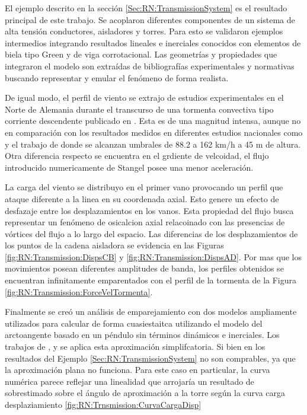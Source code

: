  El ejemplo descrito en la sección \ref{Sec:RN:TransmissionSystem} es el resultado principal de este trabajo. Se acoplaron diferentes componentes de un sistema de alta tensión conductores, aisladores y torres. Para esto se validaron ejemplos intermedios integrando resultados lineales e inerciales conocidos con elementos de biela tipo Green y de viga corrotacional. Las geometrías y propiedades que integraron el modelo son extraídas de bibliografías experimentales y normativas buscando representar y emular el fenómeno de forma realista. 

 De igual modo, el perfil de viento se extrajo de estudios experimentales en el Norte de Alemania durante el transcurso de una tormenta convectiva tipo corriente descendente publicado en \citep{stengel2017measurements}. Esta es de una magnitud intensa, aunque no en comparación con los resultados medidos en diferentes estudios nacionales como \citep{duranona2009analysis} y el trabajo de \cite{duranona2019first} donde se alcanzan umbrales de 88.2 a 162 km/h a 45 m de altura. Otra diferencia respecto se encuentra en el grdiente de velcoidad, el flujo introducido numericamente de Stangel posee una menor aceleración. 
 
 La carga del viento se distribuyo en el primer vano provocando un perfil que ataque diferente a la linea en su coordenada axial. Esto genere un efecto de desfazaje entre los desplazamientos en los vanos. Esta propiedad del flujo busca representar un fenómeno de osicalcion axial relacoinado con las presencias de vórtices del flujo a lo largo del espacio. Las diferencias de los desplazamientos de los puntos de la cadena aisladora se evidencia en las Figuras \ref{fig:RN:Transmission:DispsCB} y \ref{fig:RN:Transmission:DispsAD}. Por mas que los movimientos posean diferentes amplitudes de banda, los perfiles obtenidos se encuentran infinitamente emparentados con el perfil de la tormenta de la Figura \ref{fig:RN:Transmission:ForceVelTormenta}.  
 
 Finalmente se creó un análisis de emparejamiento con dos modelos ampliamente utilizados para calcular de forma cuasiestaitca utilizando el modelo del arctoangente basado en un péndulo sin términos dinámicos e inerciales. Los trabajos de \cite{stengel2017measurements}, \cite{duranona2009analysis} y \cite{yan2009numerical} se aplica esta aproximación simplifcatoria. Si bien en los resultados del Ejemplo \ref{Sec:RN:TransmissionSystem} no son comprables, ya que la aproximación plana no funciona. Para este caso en particular, la curva numérica parece reflejar una linealidad que arrojaría un resultado de sobrestimado sobre el ángulo de aproximación a la torre según la curva carga desplaziamiento \ref{fig:RN:Trnsmission:CurvaCargaDisp}   

